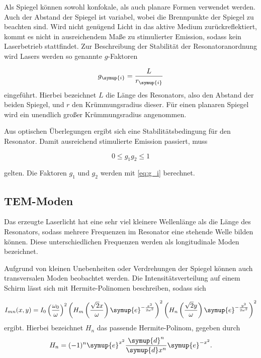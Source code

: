 Als Spiegel können sowohl konfokale, als auch planare Formen verwendet werden. Auch der Abstand der Spiegel ist variabel, wobei die Brennpunkte der Spiegel zu beachten sind.
Wird nicht genügend Licht in das aktive Medium zurückreflektiert, kommt es nicht in ausreichendem Maße zu stimulierter Emission, sodass kein Laserbetrieb stattfindet.
Zur Beschreibung der Stabilität der Resonatoranordnung wird Lasers werden so genannte $g$-Faktoren

\begin{equation}
    g_{\symup{i}} = \frac{L}{r_{\symup{i}}}
    \label{eq:g_i}
\end{equation}
eingeführt. Hierbei bezeichnet $L$ die Länge des Resonators, also den Abstand der beiden Spiegel, und $r$ den Krümmungsradius dieser. Für einen planaren Spiegel wird ein unendlich großer
Krümmungsradius angenommen.

Aus optischen Überlegungen ergibt sich eine Stabilitätsbedingung für den Resonator. Damit ausreichend stimulierte Emission passiert, muss

\begin{equation}
    0 ≤ g_1g_2 ≤ 1
    \label{eq:g1g2}
\end{equation}

gelten. Die Faktoren $g_1$ und $g_2$ werden mit \eqref{eq:g_i} berechnet.

\subsection{TEM-Moden}
Das erzeugte Laserlicht hat eine sehr viel kleinere Wellenlänge als die Länge des Resonators, sodass mehrere Frequenzen im Resonator eine stehende Welle bilden können. Diese unterschiedlichen
Frequenzen werden als longitudinale Moden bezeichnet. 

Aufgrund von kleinen Unebenheiten oder Verdrehungen der Spiegel können auch transversalen Moden beobachtet werden. Die Intensitätsverteilung auf einem Schirm lässt sich mit Hermite-Polinomen beschreiben,
sodass sich

\begin{equation}
    I_{mn}(x,y) = I_0\left(\frac{\omega_0}{\omega}\right)^2\left(H_m\left(\frac{\sqrt{2}x}{\omega}\right)\symup{e}^{-\frac{x^2}{2\omega^2}}\right)^2\left(H_n\left(\frac{\sqrt{2}y}{\omega}\right)\symup{e}^{-\frac{y^2}{2\omega^2}}\right)^2
    \label{eq:I_mn}
\end{equation}
ergibt. Hierbei bezeichnet $H_n$ das passende Hermite-Polinom, gegeben durch
\begin{equation*}
    H_n = (-1)^{n}\symup{e}^{x^2}\frac{\symup{d}^n}{\symup{d}x^n}\symup{e}^{-x^2}.
\end{equation*}

